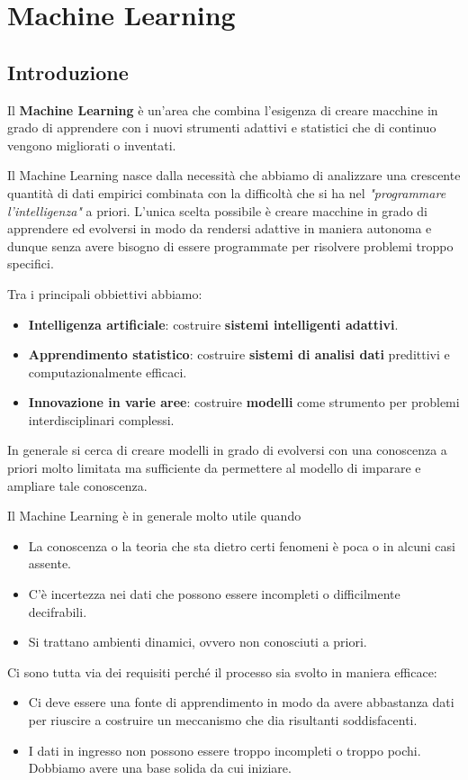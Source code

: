 \part{Machine Learning}
\chapter{Introduzione}
Il \textbf{Machine Learning} \`e un'area che combina l'esigenza di creare macchine in grado di apprendere con i nuovi
strumenti adattivi e statistici che di continuo vengono migliorati o inventati.

Il Machine Learning nasce dalla necessit\`a che abbiamo di analizzare una crescente quantit\`a di dati empirici combinata
con la difficolt\`a che si ha nel \emph{"programmare l'intelligenza"} a priori. L'unica scelta possibile \`e creare
macchine in grado di apprendere ed evolversi in modo da rendersi adattive in maniera autonoma e dunque senza avere bisogno
di essere programmate per risolvere problemi troppo specifici.

Tra i principali obbiettivi abbiamo:
\begin{itemize}
	\item \textbf{Intelligenza artificiale}: costruire \textbf{sistemi intelligenti adattivi}.
	\item \textbf{Apprendimento statistico}: costruire \textbf{sistemi di analisi dati} predittivi e computazionalmente
	      efficaci.
	\item \textbf{Innovazione in varie aree}: costruire \textbf{modelli} come strumento per problemi interdisciplinari
	      complessi.
\end{itemize}
In generale si cerca di creare modelli in grado di evolversi con una conoscenza a priori molto limitata ma sufficiente
da permettere al modello di imparare e ampliare tale conoscenza.

Il Machine Learning \`e in generale molto utile quando
\begin{itemize}
	\item La conoscenza o la teoria che sta dietro certi fenomeni \`e poca o in alcuni casi assente.
	\item C'\`e incertezza nei dati che possono essere incompleti o difficilmente decifrabili.
	\item Si trattano ambienti dinamici, ovvero non conosciuti a priori.
\end{itemize}

Ci sono tutta via dei requisiti perch\'e il processo sia svolto in maniera efficace:
\begin{itemize}
	\item Ci deve essere una fonte di apprendimento in modo da avere abbastanza dati per riuscire a costruire un
	      meccanismo che dia risultanti soddisfacenti.
	\item I dati in ingresso non possono essere troppo incompleti o troppo pochi. Dobbiamo avere una base solida da
	      cui iniziare.
\end{itemize}